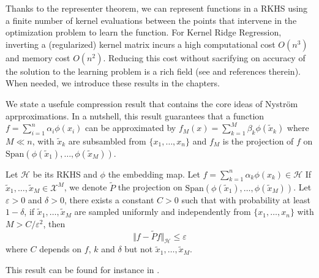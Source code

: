 Thanks to the representer theorem, we can represent functions in a RKHS using a finite number of kernel evaluations between the points that intervene in the optimization problem to learn the function. For Kernel Ridge Regression, inverting a (regularized) kernel matrix incurs a high computational cost $O(n^3)$ and memory cost $O(n^2)$. Reducing this cost without sacrifying on accuracy of the solution to the learning problem is a rich field (see \cite{blanchard,rudi2015less,falkon} and references therein). When needed, we introduce these results in the chapters.

We state a usefule compression result that contains the core ideas of Nyström aprproximations. In a nutshell, this result guarantees that a function $f=\sum_{i=1}^n\alpha_i\phi(x_i)$ can be approximated by $f_M(x) = \sum_{k=1}^M \beta_k \phi(\tilde x_k)$ where $M \ll n$, with $\tilde x_k$ are subsambled from $\lbrace x_1, \ldots, x_n\rbrace$ and $f_M$ is the projection of $f$ on $\mathrm{Span}\left(\phi(\tilde x_1), \ldots, \phi(\tilde x_M)\right)$.

\begin{mdframed}
\begin{proposition}
Let $\mathcal H$ be its RKHS and $\phi$ the embedding map. Let $f = \sum_{k=1}^n\alpha_k \phi(x_k) \in\mathcal H$
If $\tilde x_1, \ldots, \tilde x_M \in \mathcal X^M$, we denote $\tilde P$ the projection on $\mathrm{Span}\left(\phi(\tilde x_1), \ldots, \phi(\tilde x_M)\right)$. Let $\varepsilon > 0$ and $\delta > 0$, there exists a constant $C > 0$ such that with probability at least $1-\delta$, if $\tilde x_1, \ldots, \tilde x_M$ are sampled uniformly and independently from $\lbrace x_1, \ldots, x_n\rbrace$ with $M > C / \varepsilon^2 $, then
\begin{equation}
    \Vert f - \tilde Pf \Vert_\mathcal H \leq \varepsilon
\end{equation}
where $C$ depends on $f$, $k$ and $\delta$ but not $\tilde x_1, \ldots, \tilde x_M$.
\end{proposition}
\end{mdframed}

This result can be found for instance in \cite{rudi2015less}.

